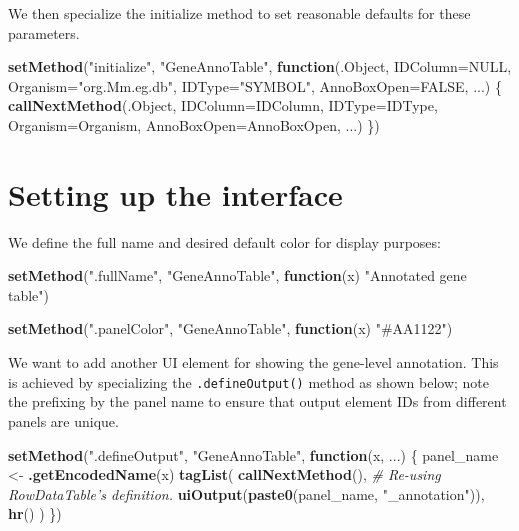 \documentclass[
]{book}
\newenvironment{Shaded}{\begin{snugshade}}{\end{snugshade}}
\newcommand{\CommentTok}[1]{\textcolor[rgb]{0.56,0.35,0.01}{\textit{#1}}}
\newcommand{\ControlFlowTok}[1]{\textcolor[rgb]{0.13,0.29,0.53}{\textbf{#1}}}
\newcommand{\DataTypeTok}[1]{\textcolor[rgb]{0.13,0.29,0.53}{#1}}
\newcommand{\KeywordTok}[1]{\textcolor[rgb]{0.13,0.29,0.53}{\textbf{#1}}}
\newcommand{\NormalTok}[1]{#1}
\newcommand{\OtherTok}[1]{\textcolor[rgb]{0.56,0.35,0.01}{#1}}
\newcommand{\StringTok}[1]{\textcolor[rgb]{0.31,0.60,0.02}{#1}}
\begin{document}
We then specialize the initialize method to set reasonable defaults for these parameters.

\begin{Shaded}
\begin{Highlighting}[]
\KeywordTok{setMethod}\NormalTok{(}\StringTok{"initialize"}\NormalTok{, }\StringTok{"GeneAnnoTable"}\NormalTok{, }\ControlFlowTok{function}\NormalTok{(.Object, }\DataTypeTok{IDColumn=}\OtherTok{NULL}\NormalTok{, }
    \DataTypeTok{Organism=}\StringTok{"org.Mm.eg.db"}\NormalTok{, }\DataTypeTok{IDType=}\StringTok{"SYMBOL"}\NormalTok{, }\DataTypeTok{AnnoBoxOpen=}\OtherTok{FALSE}\NormalTok{, ...)}
\NormalTok{\{}
    \KeywordTok{callNextMethod}\NormalTok{(.Object, }\DataTypeTok{IDColumn=}\NormalTok{IDColumn, }\DataTypeTok{IDType=}\NormalTok{IDType,}
        \DataTypeTok{Organism=}\NormalTok{Organism, }\DataTypeTok{AnnoBoxOpen=}\NormalTok{AnnoBoxOpen, ...)}
\NormalTok{\})}
\end{Highlighting}
\end{Shaded}

\hypertarget{setting-up-the-interface}{%
\section{Setting up the interface}\label{setting-up-the-interface}}

We define the full name and desired default color for display purposes:

\begin{Shaded}
\begin{Highlighting}[]
\KeywordTok{setMethod}\NormalTok{(}\StringTok{".fullName"}\NormalTok{, }\StringTok{"GeneAnnoTable"}\NormalTok{, }\ControlFlowTok{function}\NormalTok{(x) }\StringTok{"Annotated gene table"}\NormalTok{)}

\KeywordTok{setMethod}\NormalTok{(}\StringTok{".panelColor"}\NormalTok{, }\StringTok{"GeneAnnoTable"}\NormalTok{, }\ControlFlowTok{function}\NormalTok{(x) }\StringTok{"#AA1122"}\NormalTok{)}
\end{Highlighting}
\end{Shaded}

We want to add another UI element for showing the gene-level annotation.
This is achieved by specializing the \texttt{.defineOutput()} method as shown below;
note the prefixing by the panel name to ensure that output element IDs from different panels are unique.

\begin{Shaded}
\begin{Highlighting}[]
\KeywordTok{setMethod}\NormalTok{(}\StringTok{".defineOutput"}\NormalTok{, }\StringTok{"GeneAnnoTable"}\NormalTok{, }\ControlFlowTok{function}\NormalTok{(x, ...) \{}
\NormalTok{    panel_name <-}\StringTok{ }\KeywordTok{.getEncodedName}\NormalTok{(x)}
    \KeywordTok{tagList}\NormalTok{(}
        \KeywordTok{callNextMethod}\NormalTok{(), }\CommentTok{# Re-using RowDataTable's definition.}
        \KeywordTok{uiOutput}\NormalTok{(}\KeywordTok{paste0}\NormalTok{(panel_name, }\StringTok{"_annotation"}\NormalTok{)),}
        \KeywordTok{hr}\NormalTok{()}
\NormalTok{    )}
\NormalTok{\})}
\end{Highlighting}
\end{Shaded}
\end{document}
